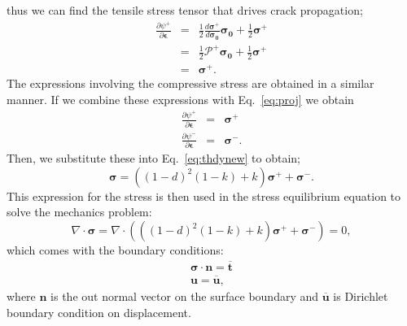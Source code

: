 \documentclass[3p,10pt,sort&compress]{elsarticle}
\begin{document}
thus we can find the tensile stress tensor that drives crack propagation;
\begin{eqnarray}
  \frac{\partial \psi^+}{\partial \boldsymbol{\epsilon}} &=& \frac{1}{2}\frac{d \boldsymbol{\sigma^+}}{d \boldsymbol{\sigma_0}} \boldsymbol{\sigma_0} + \frac{1}{2} \boldsymbol{\sigma^+} \\
  &=& \frac{1}{2} \boldsymbol{\mathcal{P^+}} \boldsymbol{\sigma_0}  + \frac{1}{2} \boldsymbol{\sigma^+} \\
  &=& \boldsymbol{\sigma^+}.
\end{eqnarray}
The expressions involving the compressive stress are obtained in a similar manner. If we combine these expressions with Eq.~\eqref{eq:proj} we obtain
\begin{eqnarray}
	\frac{\partial \psi^+}{\partial \boldsymbol{\epsilon}} &=& \boldsymbol{\sigma}^+ \\
	\frac{\partial \psi^-}{\partial \boldsymbol{\epsilon}} &=& \boldsymbol{\sigma}^-.
\end{eqnarray}
Then, we substitute these into Eq.~\eqref{eq:thdynew} to obtain;
\begin{equation}
	\boldsymbol{\sigma} = \left((1-d)^2(1-k) + k \right)\boldsymbol{\sigma}^+ + \boldsymbol{\sigma}^-.
\end{equation}
This expression for the stress is then used in the stress equilibrium equation to solve the mechanics problem:
\begin{equation}
  \nabla \cdot \boldsymbol{\sigma}  = \nabla \cdot \left( \left((1-d)^2(1-k) + k\right)\boldsymbol{\sigma}^+ + \boldsymbol{\sigma}^- \right) = 0,
\end{equation}
which comes with the boundary conditions:
\begin{eqnarray}
  \boldsymbol{\sigma} \cdot \boldsymbol{n} = \boldsymbol{\overline{t}} \\
  \boldsymbol{u} = \boldsymbol{\overline{u}},
\end{eqnarray}
where $\boldsymbol{n}$ is the out normal vector on the surface boundary and $\boldsymbol{\overline{u}}$ is Dirichlet boundary condition on displacement.



\end{document}

